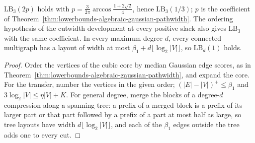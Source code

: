 \begin{theorem}
  \label{thm:lowerbounds-frontier-layouts}
  \leanok
  $\mathrm{LB}_3(2p)$ holds with $p=\tfrac{3}{2\pi}\arccos\tfrac{1+2\sqrt2}{4}$,
  hence $\mathrm{LB}_3(1/3)$; $p$ is the coefficient of
  Theorem~\ref{thm:lowerbounds-algebraic-gaussian-pathwidth}. The ordering
  hypothesis of the cutwidth development at every positive slack also gives
  $\mathrm{LB}_3$ with the same coefficient.
  In every maximum degree $d$, every connected multigraph has a layout of width
  at most $\beta_1+d\lfloor\log_2|V|\rfloor$, so $\mathrm{LB}_d(1)$ holds.
\end{theorem}
\begin{proof}
  \leanok
  Order the vertices of the cubic core by median Gaussian edge scores, as in
  Theorem~\ref{thm:lowerbounds-algebraic-gaussian-pathwidth}, and expand the core.
  For the transfer, number the vertices in the given order; $(|E|-|V|)^+\le\beta_1$ and
  $3\log_2|V|\le\eta|V|+K$. For general degree, merge the blocks of a
  degree-$d$ compression along a spanning tree: a prefix of a merged block is a
  prefix of its larger part or that part followed by a prefix of a part at most
  half as large, so tree layouts have width $d\lfloor\log_2|V|\rfloor$, and each
  of the $\beta_1$ edges outside the tree adds one to every cut.
\end{proof}

